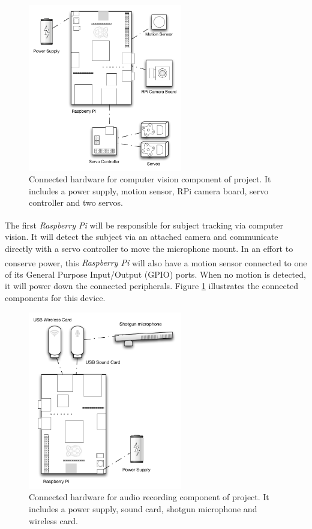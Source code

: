 \documentclass[11pt,a4paper,titlepage]{report}
\newcommand{\rpi}{\textit{Raspberry Pi\textsuperscript{\textregistered}}}
\begin{document}
\begin{figure}
\centering
\includegraphics[width=0.6\textwidth]{graphs/rpi_1.pdf}
\caption{Connected hardware for computer vision component of project. It includes a power supply, motion sensor, RPi camera board, servo controller and two servos.}
\label{fig:cvhardware}
\end{figure}


The first \rpi\xspace will be responsible for subject tracking via computer vision. It will detect the subject via an attached camera and communicate directly with a servo controller to move the microphone mount. In an effort to conserve power, this \rpi\xspace will also have a motion sensor connected to one of its General Purpose Input/Output (GPIO) ports. When no motion is detected, it will power down the connected peripherals. Figure \ref{fig:cvhardware} illustrates the connected components for this device.


\begin{figure}
\centering
\includegraphics[width=0.6\textwidth]{graphs/rpi_2.pdf}
\caption{Connected hardware for audio recording component of project. It includes a power supply, sound card, shotgun microphone and wireless card.}
\label{fig:audiohardware}
\end{figure}
\end{document}
